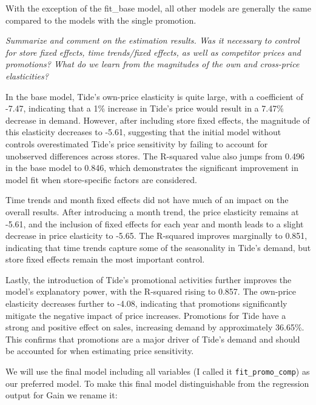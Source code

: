 \documentclass[
]{article}
\begin{document}
With the exception of the fit\_base model, all other models are
generally the same compared to the models with the single promotion.

\bigskip

\emph{Summarize and comment on the estimation results. Was it necessary
to control for store fixed effects, time trends/fixed effects, as well
as competitor prices and promotions? What do we learn from the
magnitudes of the own and cross-price elasticities?}

In the base model, Tide's own-price elasticity is quite large, with a
coefficient of -7.47, indicating that a 1\% increase in Tide's price
would result in a 7.47\% decrease in demand. However, after including
store fixed effects, the magnitude of this elasticity decreases to
-5.61, suggesting that the initial model without controls overestimated
Tide's price sensitivity by failing to account for unobserved
differences across stores. The R-squared value also jumps from 0.496 in
the base model to 0.846, which demonstrates the significant improvement
in model fit when store-specific factors are considered.

Time trends and month fixed effects did not have much of an impact on
the overall results. After introducing a month trend, the price
elasticity remains at -5.61, and the inclusion of fixed effects for each
year and month leads to a slight decrease in price elasticity to -5.65.
The R-squared improves marginally to 0.851, indicating that time trends
capture some of the seasonality in Tide's demand, but store fixed
effects remain the most important control.

Lastly, the introduction of Tide's promotional activities further
improves the model's explanatory power, with the R-squared rising to
0.857. The own-price elasticity decreases further to -4.08, indicating
that promotions significantly mitigate the negative impact of price
increases. Promotions for Tide have a strong and positive effect on
sales, increasing demand by approximately 36.65\%. This confirms that
promotions are a major driver of Tide's demand and should be accounted
for when estimating price sensitivity.

\bigskip

We will use the final model including all variables (I called it
\texttt{fit\_promo\_comp}) as our preferred model. To make this final
model distinguishable from the regression output for Gain we rename it:
\end{document}

